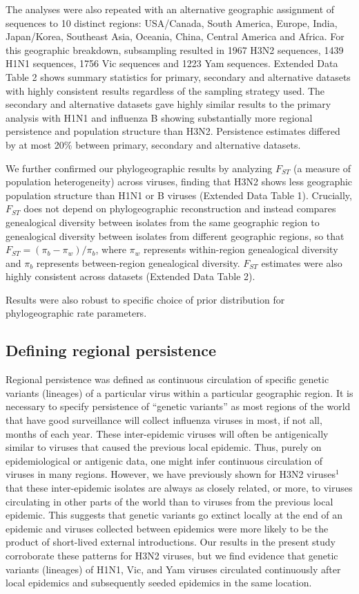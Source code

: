 \documentclass[11pt,oneside,letterpaper]{article}
\begin{document}
The analyses were also repeated with an alternative geographic assignment of sequences to 10 distinct regions: USA/Canada, South America, Europe, India, Japan/Korea, Southeast Asia, Oceania, China, Central America and Africa.
For this geographic breakdown, subsampling resulted in 1967 H3N2 sequences, 1439 H1N1 sequences, 1756 Vic sequences and 1223 Yam sequences.
Extended Data Table 2 shows summary statistics for primary, secondary and alternative datasets with highly consistent results regardless of the sampling strategy used.
The secondary and alternative datasets gave highly similar results to the primary analysis with H1N1 and influenza B showing substantially more regional persistence and population structure than H3N2.
Persistence estimates differed by at most 20\% between primary, secondary and alternative datasets.

We further confirmed our phylogeographic results by analyzing $F_{ST}$ (a measure of population heterogeneity\cite{Weir84}) across viruses, finding that H3N2 shows less geographic population structure than H1N1 or B viruses (Extended Data Table 1).
Crucially, $F_{ST}$ does not depend on phylogeographic reconstruction and instead compares genealogical diversity between isolates from the same geographic region to genealogical diversity between isolates from different geographic regions, so that $F_{ST} = (\pi_b - \pi_w) / \pi_b$, where $\pi_w$ represents within-region genealogical diversity and $\pi_b$ represents between-region genealogical diversity. $F_{ST}$ estimates were also highly consistent across datasets (Extended Data Table 2).

Results were also robust to specific choice of prior distribution for phylogeographic rate parameters.

\subsection*{Defining regional persistence}

Regional persistence was defined as continuous circulation of specific genetic variants (lineages) of a particular virus within a particular geographic region.
It is necessary to specify persistence of ``genetic variants'' as most regions of the world that have good surveillance will collect influenza viruses in most, if not all, months of each year.
These inter-epidemic viruses will often be antigenically similar to viruses that caused the previous local epidemic.
Thus, purely on epidemiological or antigenic data, one might infer continuous circulation of viruses in many regions.
However, we have previously shown for H3N2 viruses$^1$ that these inter-epidemic isolates are always as closely related, or more, to viruses circulating in other parts of the world than to viruses from the previous local epidemic.
This suggests that genetic variants go extinct locally at the end of an epidemic and viruses collected between epidemics were more likely to be the product of short-lived external introductions.
Our results in the present study corroborate these patterns for H3N2 viruses, but we find evidence that genetic variants (lineages) of H1N1, Vic, and Yam viruses circulated continuously after local epidemics and subsequently seeded epidemics in the same location.
\end{document}
